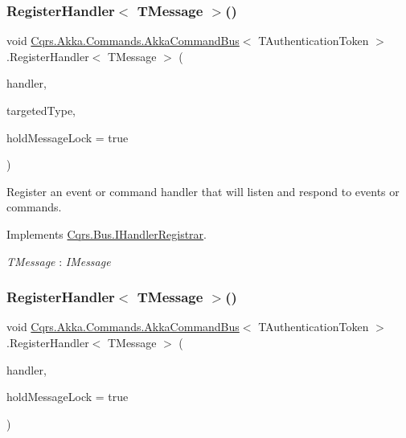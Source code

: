 \subsubsection{\texorpdfstring{Register\+Handler$<$ T\+Message $>$()}{RegisterHandler< TMessage >()}\hspace{0.1cm}{\footnotesize\ttfamily [1/2]}}
{\footnotesize\ttfamily void \hyperlink{classCqrs_1_1Akka_1_1Commands_1_1AkkaCommandBus}{Cqrs.\+Akka.\+Commands.\+Akka\+Command\+Bus}$<$ T\+Authentication\+Token $>$.Register\+Handler$<$ T\+Message $>$ (\begin{DoxyParamCaption}\item[{Action$<$ T\+Message $>$}]{handler,  }\item[{Type}]{targeted\+Type,  }\item[{bool}]{hold\+Message\+Lock = {\ttfamily true} }\end{DoxyParamCaption})}



Register an event or command handler that will listen and respond to events or commands. 



Implements \hyperlink{interfaceCqrs_1_1Bus_1_1IHandlerRegistrar_ab6ca4dfdc54a5aeebe4651dbdb479f55}{Cqrs.\+Bus.\+I\+Handler\+Registrar}.

\begin{Desc}
\item[Type Constraints]\begin{description}
\item[{\em T\+Message} : {\em I\+Message}]\end{description}
\end{Desc}
\mbox{\label{classCqrs_1_1Akka_1_1Commands_1_1AkkaCommandBus_adc21072d2b02c745747c4d585a53dba3}} 
\subsubsection{\texorpdfstring{Register\+Handler$<$ T\+Message $>$()}{RegisterHandler< TMessage >()}\hspace{0.1cm}{\footnotesize\ttfamily [2/2]}}
{\footnotesize\ttfamily void \hyperlink{classCqrs_1_1Akka_1_1Commands_1_1AkkaCommandBus}{Cqrs.\+Akka.\+Commands.\+Akka\+Command\+Bus}$<$ T\+Authentication\+Token $>$.Register\+Handler$<$ T\+Message $>$ (\begin{DoxyParamCaption}\item[{Action$<$ T\+Message $>$}]{handler,  }\item[{bool}]{hold\+Message\+Lock = {\ttfamily true} }\end{DoxyParamCaption})}



